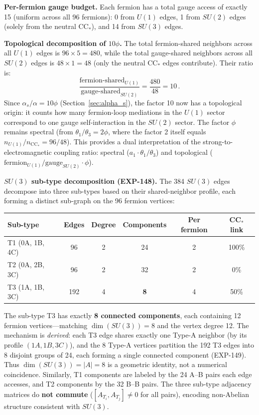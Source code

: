 \documentclass[12pt,a4paper]{article}
\begin{document}
\textbf{Per-fermion gauge budget.} Each fermion has a total gauge access of exactly 15 (uniform across all 96 fermions): 0 from $U(1)$ edges, 1 from $SU(2)$ edges (solely from the neutral CC$_*$), and 14 from $SU(3)$ edges.

\textbf{Topological decomposition of $10\phi$.} The total fermion-shared neighbors across all $U(1)$ edges is $96 \times 5 = 480$, while the total gauge-shared neighbors across all $SU(2)$ edges is $48 \times 1 = 48$ (only the neutral CC$_*$ edges contribute). Their ratio is:
\begin{equation}
\frac{\text{fermion-shared}_{U(1)}}{\text{gauge-shared}_{SU(2)}} = \frac{480}{48} = 10\,.
\end{equation}
Since $\alpha_s/\alpha = 10\phi$ (Section~\ref{sec:alpha_s}), the factor 10 now has a topological origin: it counts how many fermion-loop mediations in the $U(1)$ sector correspond to one gauge self-interaction in the $SU(2)$ sector. The factor $\phi$ remains spectral (from $\theta_1/\theta_3 = 2\phi$, where the factor 2 itself equals $n_{U(1)}/n_{\text{CC}_*} = 96/48$). This provides a dual interpretation of the strong-to-electromagnetic coupling ratio: spectral ($a_1 \cdot \theta_1/\theta_3$) and topological ($\text{fermion}_{U(1)}/\text{gauge}_{SU(2)} \cdot \phi$).

\textbf{$SU(3)$ sub-type decomposition (EXP-148).} The 384 $SU(3)$ edges decompose into three sub-types based on their shared-neighbor profile, each forming a distinct sub-graph on the 96 fermion vertices:
\begin{center}
\begin{tabular}{lccccc}
\toprule
\textbf{Sub-type} & \textbf{Edges} & \textbf{Degree} & \textbf{Components} & \textbf{Per fermion} & \textbf{CC$_*$ link} \\
\midrule
T1 (0A, 1B, 4C) & 96 & 2 & 24 & 2 & 100\% \\
T2 (0A, 2B, 3C) & 96 & 2 & 32 & 2 & 0\% \\
T3 (1A, 1B, 3C) & 192 & 4 & \textbf{8} & 4 & 50\% \\
\bottomrule
\end{tabular}
\end{center}
The sub-type T3 has exactly \textbf{8 connected components}, each containing 12 fermion vertices---matching $\dim(SU(3)) = 8$ and the vertex degree 12. The mechanism is \emph{derived}: each T3 edge shares exactly one Type-A neighbor (by its profile $(1A,1B,3C)$), and the 8 Type-A vertices partition the 192 T3 edges into 8 disjoint groups of 24, each forming a single connected component (EXP-149). Thus $\dim(SU(3)) = |A| = 8$ is a geometric identity, not a numerical coincidence. Similarly, T1 components are labeled by the 24 A--B pairs each edge accesses, and T2 components by the 32 B--B pairs. The three sub-type adjacency matrices do \textbf{not commute} ($[A_{T_i}, A_{T_j}] \neq 0$ for all pairs), encoding non-Abelian structure consistent with $SU(3)$.
\end{document}
